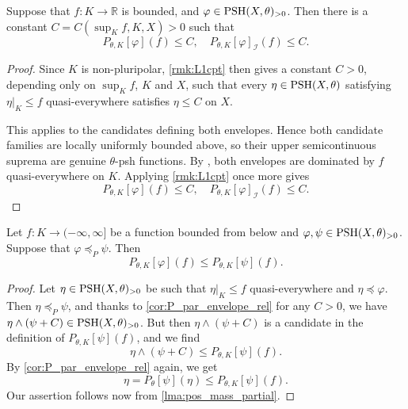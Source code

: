 \begin{corollary}\label{cor:Ppartbdd_bdabove}
    Suppose that $f\colon K\rightarrow \mathbb{R}$ is bounded, and $\varphi\in \mathrm{PSH}(X,\theta)_{>0}$. Then there is a constant $C=C(\sup_K f,K,X)>0$ such that
        \[
            P_{\theta,K}[\varphi](f)\leq C,\quad P_{\theta,K}[\varphi]_{\mathcal{I}}(f)\leq C.
        \]
\end{corollary}
\begin{proof}
    Since $K$ is non-pluripolar, \cref{rmk:L1cpt} then gives a constant $C>0$, depending only on $\sup_K f$, $K$ and $X$, such that every $\eta\in\mathrm{PSH}(X,\theta)$ satisfying $\eta|_K\leq f$ quasi-everywhere satisfies $\eta\leq C$ on $X$.

    This applies to the candidates defining both envelopes. Hence both candidate families are locally uniformly bounded above, so their upper semicontinuous suprema are genuine $\theta$-psh functions. By , both envelopes are dominated by $f$ quasi-everywhere on $K$. Applying \cref{rmk:L1cpt} once more gives
    \[
        P_{\theta,K}[\varphi](f)\leq C,\quad P_{\theta,K}[\varphi]_{\mathcal I}(f)\leq C.
    \]
\end{proof}


\begin{proposition}\label{prop:Penv_partial_monotone}
    Let $f\colon K\rightarrow (-\infty,\infty]$ be a function bounded from below and $\varphi,\psi\in \mathrm{PSH}(X,\theta)_{>0}$. Suppose that $\varphi\preceq_{P} \psi$. Then
    \[
    P_{\theta,K}[\varphi](f)\leq P_{\theta,K}[\psi](f).
    \]
\end{proposition}
\begin{proof}
    Let $\eta\in \mathrm{PSH}(X,\theta)_{>0}$ be such that $\eta|_K\leq f$ quasi-everywhere and $\eta\preceq \varphi$. Then $\eta\preceq_P \psi$, and thanks to \cref{cor:P_par_envelope_rel} for any $C>0$, we have $\eta\land (\psi+C)\in \mathrm{PSH}(X,\theta)_{>0}$. But then $\eta\land (\psi+C)$ is a candidate in the definition of $P_{\theta,K}[\psi](f)$, and we find
    \[
    \eta\land (\psi+C)\leq P_{\theta,K}[\psi](f).
    \]
    By \cref{cor:P_par_envelope_rel} again, we get
    \[
    \eta=P_{\theta}[\psi](\eta)\leq P_{\theta,K}[\psi](f).
    \]
    Our assertion follows now from \cref{lma:pos_mass_partial}.
\end{proof}

